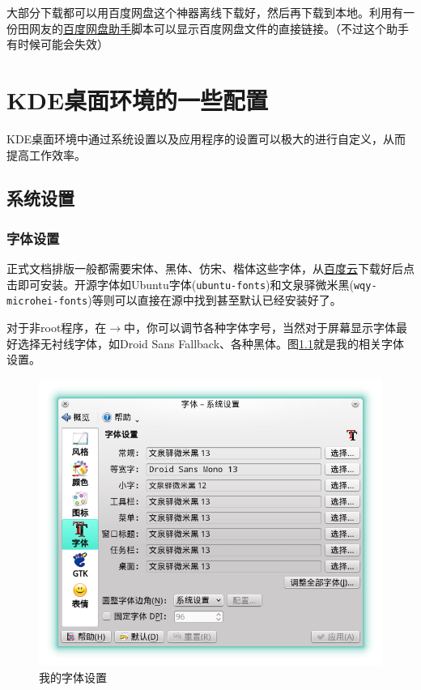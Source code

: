 \documentclass[11pt,openany]{book}
\newcommand{\soft}[1]{\texttt{\textcolor{dgreen}{#1}}}
\newcommand{\menu}[1]{\fbox{#1}}
\newcommand{\me}{$\rightarrow$}
\begin{document}
大部分下载都可以用百度网盘这个神器离线下载好，然后再下载到本地。利用有一份田网友的\href{http://git.oschina.net/youyifentian/dupanlink}{百度网盘助手}脚本可以显示百度网盘文件的直接链接。（不过这个助手有时候可能会失效）
\chapter{KDE桌面环境的一些配置}
KDE桌面环境中通过系统设置以及应用程序的设置可以极大的进行自定义，从而提高工作效率。
\section{系统设置}
\subsection{字体设置}
正式文档排版一般都需要宋体、黑体、仿宋、楷体这些字体，从\href{http://pan.baidu.com/s/1mgiHWmO}{百度云}下载好后点击即可安装。开源字体如Ubuntu字体(\soft{ubuntu-fonts})和文泉驿微米黑(\soft{wqy-microhei-fonts})等则可以直接在源中找到甚至默认已经安装好了。

对于非root程序，在\menu{应用程序外观}\me\menu{字体设置}中，你可以调节各种字体字号，当然对于屏幕显示字体最好选择无衬线字体，如Droid Sans Fallback、各种黑体。图\ref{myfont}就是我的相关字体设置。
\begin{figure}[htbp]
 \centering
 \includegraphics[width=\textwidth]{./pic/fontsettings.png}
 \caption{我的字体设置}\label{myfont}
\end{figure}
\end{document}
